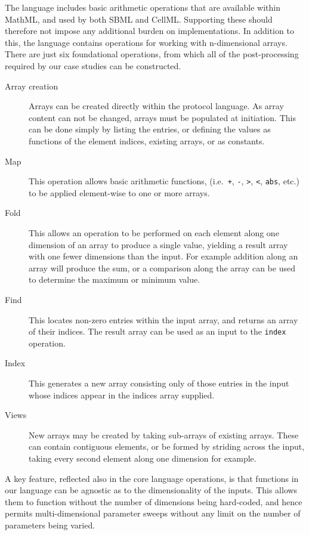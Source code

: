 \documentclass[preprint,authoryear,12pt]{elsarticle}
\newcommand{\code}[1]{\texttt{#1}}
\begin{document}
The language includes basic arithmetic operations that are available within MathML, and used by both SBML and CellML.
Supporting these should therefore not impose any additional burden on implementations.
In addition to this, the language contains operations for working with n-dimensional arrays.
There are just six foundational operations, from which all of the post-processing required by our case studies can be constructed.
\begin{description}
\item[Array creation]
  Arrays can be created directly within the protocol language.
  As array content can not be changed, arrays must be populated at initiation.
  This can be done simply by listing the entries, or defining the values as functions of the element indices, existing arrays, or as constants.
\item[Map]
  This operation allows basic arithmetic functions, (i.e.\ \code{+}, \code{-}, \code{>}, \code{<}, \code{abs}, etc.) to be applied element-wise to one or more arrays.
\item[Fold]
  This allows an operation to be performed on each element along one dimension of an array to produce a single value, yielding a result array with one fewer dimensions than the input.
  For example addition along an array will produce the sum, or a comparison along the array can be used to determine the maximum or minimum value.
\item[Find]
  This locates non-zero entries within the input array, and returns an array of their indices.
  The result array can be used as an input to the \code{index} operation.
\item[Index]
  This generates a new array consisting only of those entries in the input whose indices appear in the indices array supplied.
\item[Views]
  New arrays may be created by taking sub-arrays of existing arrays.
  These can contain contiguous elements, or be formed by striding across the input, taking every second element along one dimension for example.
\end{description}


A key feature, reflected also in the core language operations, is that functions in our language can be agnostic as to the dimensionality of the inputs.
This allows them to function without the number of dimensions being hard-coded, and hence permits multi-dimensional parameter sweeps without any limit on the number of parameters being varied.


\end{document}
